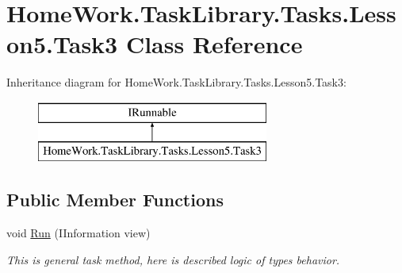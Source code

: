 \hypertarget{class_home_work_1_1_task_library_1_1_tasks_1_1_lesson5_1_1_task3}{}\section{Home\+Work.\+Task\+Library.\+Tasks.\+Lesson5.\+Task3 Class Reference}
\label{class_home_work_1_1_task_library_1_1_tasks_1_1_lesson5_1_1_task3}
Inheritance diagram for Home\+Work.\+Task\+Library.\+Tasks.\+Lesson5.\+Task3\+:\begin{figure}[H]
\begin{center}
\leavevmode
\includegraphics[height=2.000000cm]{class_home_work_1_1_task_library_1_1_tasks_1_1_lesson5_1_1_task3}
\end{center}
\end{figure}
\subsection*{Public Member Functions}
\begin{DoxyCompactItemize}
\item 
void \mbox{\hyperlink{class_home_work_1_1_task_library_1_1_tasks_1_1_lesson5_1_1_task3_afd248844fad7e6015ea0ee3fc2a9be24}{Run}} (I\+Information view)
\begin{DoxyCompactList}\small\item\em This is general task method, here is described logic of types behavior. \end{DoxyCompactList}\end{DoxyCompactItemize}
